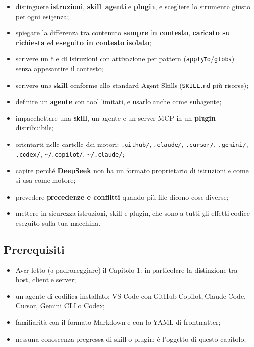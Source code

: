 \documentclass[
  italian,
  10pt,
]{book}
\providecommand{\tightlist}{%
  \setlength{\itemsep}{0pt}\setlength{\parskip}{0pt}}
\begin{document}
\begin{itemize}
\tightlist
\item
  distinguere \textbf{istruzioni}, \textbf{skill}, \textbf{agenti} e
  \textbf{plugin}, e scegliere lo strumento giusto per ogni esigenza;
\item
  spiegare la differenza tra contenuto \textbf{sempre in contesto},
  \textbf{caricato su richiesta} ed \textbf{eseguito in contesto
  isolato};
\item
  scrivere un file di istruzioni con attivazione per pattern
  (\texttt{applyTo}/\texttt{globs}) senza appesantire il contesto;
\item
  scrivere una \textbf{skill} conforme allo standard Agent Skills
  (\texttt{SKILL.md} più risorse);
\item
  definire un \textbf{agente} con tool limitati, e usarlo anche come
  subagente;
\item
  impacchettare una \textbf{skill}, un agente e un server MCP in un
  \textbf{plugin} distribuibile;
\item
  orientarti nelle cartelle dei motori: \texttt{.github/},
  \texttt{.claude/}, \texttt{.cursor/}, \texttt{.gemini/},
  \texttt{.codex/}, \texttt{\textasciitilde{}/.copilot/},
  \texttt{\textasciitilde{}/.claude/};
\item
  capire perché \textbf{DeepSeek} non ha un formato proprietario di
  istruzioni e come si usa come motore;
\item
  prevedere \textbf{precedenze e conflitti} quando più file dicono cose
  diverse;
\item
  mettere in sicurezza istruzioni, skill e plugin, che sono a tutti gli
  effetti codice eseguito sulla tua macchina.
\end{itemize}

\subsection{Prerequisiti}\label{prerequisiti}

\begin{itemize}
\tightlist
\item
  Aver letto (o padroneggiare) il Capitolo 1: in particolare la
  distinzione tra host, client e server;
\item
  un agente di codifica installato: VS Code con GitHub Copilot, Claude
  Code, Cursor, Gemini CLI o Codex;
\item
  familiarità con il formato Markdown e con lo YAML di frontmatter;
\item
  nessuna conoscenza pregressa di skill o plugin: è l'oggetto di questo
  capitolo.
\end{itemize}
\end{document}
